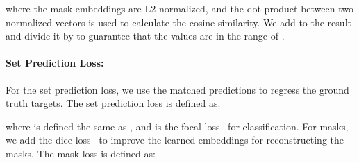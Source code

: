 \documentclass[10pt,twocolumn,letterpaper]{article}
\begin{document}
where the mask embeddings are L2 normalized, and the dot product between two normalized vectors is used to calculate the cosine similarity.
We add  to the result and divide it by  to guarantee that the values are in the range of .
\paragraph{Set Prediction Loss:} For the set prediction loss, we use the matched predictions to regress the ground truth targets.
The set prediction loss is defined as:

where  is defined the same as , and  is the focal loss~\cite{lin2017focal} for classification.
For masks, we add the dice loss~\cite{milletari2016v} to improve the learned embeddings for reconstructing the masks.
The mask loss is defined as:
\end{document}
